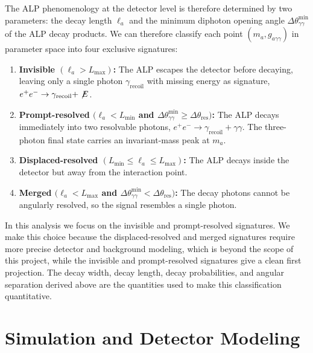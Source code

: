 \documentclass[12pt,a4paper]{article}
\begin{document}
The ALP phenomenology at the detector level is therefore determined by two
parameters: the decay length $\ell_a$ and the minimum diphoton opening angle
$\Delta\theta^{\mathrm{min}}_{\gamma\gamma}$ of the ALP decay products. We can
therefore classify each point $(m_{a},g_{a\gamma\gamma})$ in parameter space into four
exclusive signatures:
\begin{enumerate}
    \item \textbf{Invisible $(\ell_a>L_\mathrm{max})$:}
    The ALP escapes the detector before decaying, leaving only a single photon
    $\gamma_{\mathrm{recoil}}$ with missing energy as signature,
    $e^+e^-\to\gamma_{\mathrm{recoil}}+\not\!E$.

    \item \textbf{Prompt-resolved $(\ell_a<L_{\mathrm{min}}$ and
    $\Delta\theta^\mathrm{min}_{\gamma\gamma}\geq\Delta\theta_\mathrm{res})$:}
    The ALP decays immediately into two resolvable photons,
    $e^+e^-\to\gamma_{\mathrm{recoil}}+\gamma\gamma$. The three-photon final
    state carries an invariant-mass peak at $m_{a}$.

    \item \textbf{Displaced-resolved
    $(L_{\mathrm{min}}\leq \ell_a \leq L_{\mathrm{max}})$:}
    The ALP decays inside the detector but away from the interaction point.

    \item \textbf{Merged $(\ell_a<L_{\mathrm{max}}$ and
    $\Delta\theta^\mathrm{min}_{\gamma\gamma}<\Delta\theta_\mathrm{res})$:}
    The decay photons cannot be angularly resolved, so the signal resembles a
    single photon.
\end{enumerate}

In this analysis we focus on the invisible and prompt-resolved signatures. We
make this choice because the displaced-resolved and merged signatures require
more precise detector and background modeling, which is beyond the scope of
this project, while the invisible and prompt-resolved signatures give a clean
first projection. The decay width, decay length, decay probabilities, and
angular separation derived above are the quantities used to make this
classification quantitative.

\section{Simulation and Detector Modeling}
\label{sec:simulation}
\end{document}
